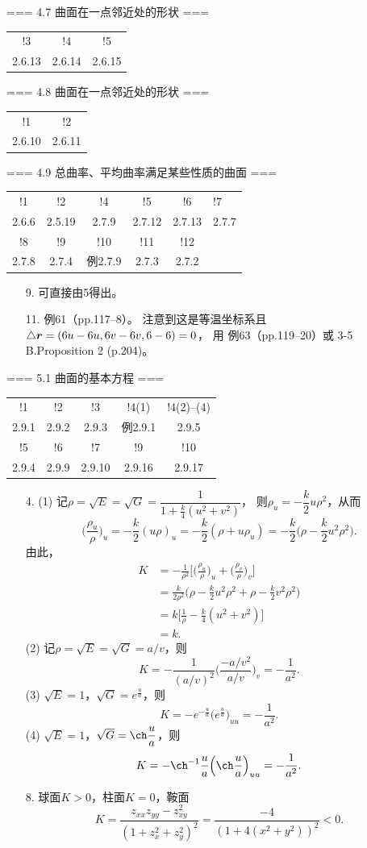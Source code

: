 === 4.7 曲面在一点邻近处的形状 ===
\begin{tabular}{ccc}!3&!4&!5\\2.6.13&2.6.14&2.6.15\end{tabular}

=== 4.8 曲面在一点邻近处的形状 ===
\begin{tabular}{cc}!1&!2\\2.6.10&2.6.11\end{tabular}

=== 4.9 总曲率、平均曲率满足某些性质的曲面 ===
\begin{tabular}{ccccc}
    !1&!2&!4&!5&!6&!7\\
    2.6.6&2.5.19&2.7.9&2.7.12&2.7.13&2.7.7\\
    !8&!9&!10&!11&!12\\
    2.7.8&2.7.4&例2.7.9&2.7.3&2.7.2
\end{tabular}
\begin{itemize}
    \item[9.] 可直接由5得出。
    \item[11.] \cite{JH} 例61（pp.117--8）。
    注意到这是等温坐标系且$\triangle\boldsymbol{r}=(6u-6u,6v-6v,6-6)=0$，
    用\cite{JH} 例63（pp.119--20）或\cite{dC} 3-5 B.Proposition 2 (p.204)。
\end{itemize}

=== 5.1 曲面的基本方程 ===
\begin{tabular}{ccccc}
    !1&!2&!3&!4(1)&!4(2)--(4)\\2.9.1&2.9.2&2.9.3&例2.9.1&2.9.5\\
    !5&!6&!7&!9&!10\\2.9.4&2.9.9&2.9.10&2.9.16&2.9.17
\end{tabular}
\begin{itemize}
    \item[4.] (1) 记$\rho=\sqrt{E}=\sqrt{G}=\dfrac{1}{1+\frac{k}{4}(u^2+v^2)}$，
    则$\rho_u=-\dfrac{k}{2}u\rho^2$，从而
    \[\Big(\frac{\rho_u}{\rho}\Big)_u=-\frac{k}{2}(u\rho)_u
    =-\frac{k}{2}(\rho+u\rho_u)=-\frac{k}{2}\Big(\rho-\frac{k}{2}u^2\rho^2\Big).\]
    由此，\begin{align*}
        K&=-\frac{1}{\rho^2}\bigg[\Big(\frac{\rho_u}{\rho}\Big)_u
        +\Big(\frac{\rho_v}{\rho}\Big)_v\bigg]\\
        &=\frac{k}{2\rho^2}\Big(\rho-\frac{k}{2}u^2\rho^2+\rho-\frac{k}{2}v^2\rho^2\Big)\\
        &=k\bigg[\frac{1}{\rho}-\frac{k}{4}(u^2+v^2)\bigg]\\
        &=k.
    \end{align*}
    (2) 记$\rho=\sqrt{E}=\sqrt{G}=a/v$，则
    \[K=-\frac{1}{(a/v)^2}\bigg(\frac{-a/v^2}{a/v}\bigg)_v=-\frac{1}{a^2}.\]
    (3) $\sqrt{E}=1$，$\sqrt{G}=e^{\frac{u}{a}}$，则
    \[K=-e^{-\frac{u}{a}}\big(e^{\frac{u}{a}}\big)_{uu}=-\frac{1}{a^2}.\]
    (4) $\sqrt{E}=1$，$\sqrt{G}=\ch\dfrac{u}{a}$，则
    \[K=-\ch^{-1}\frac{u}{a}\Big(\ch\frac{u}{a}\Big)_{uu}=-\frac{1}{a^2}.\]

    \item[8.] 球面$K>0$，柱面$K=0$，鞍面
    \[K=\frac{z_{xx}z_{yy}-z_{xy}^2}{(1+z_x^2+z_y^2)^2}=\frac{-4}{(1+4(x^2+y^2))^2}<0.\]
\end{itemize}

